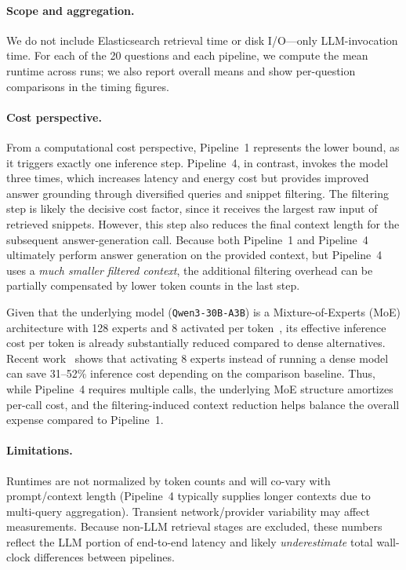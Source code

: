 \documentclass[manuscript,screen]{acmart}
\begin{document}
\begin{CCSXML}
	\paragraph{Scope and aggregation.}
	We do not include Elasticsearch retrieval time or disk I/O—only LLM-invocation time. For each
	of the 20 questions and each pipeline, we compute the mean runtime across runs; we also report
	overall means and show per-question comparisons in the timing figures.
	
	\paragraph{Cost perspective.}
	From a computational cost perspective, Pipeline~1 represents the lower bound, as it triggers
	exactly one inference step. Pipeline~4, in contrast, invokes the model three times, which
	increases latency and energy cost but provides improved answer grounding through diversified
	queries and snippet filtering. The filtering step is likely the decisive cost factor, since it
	receives the largest raw input of retrieved snippets. However, this step also reduces the final
	context length for the subsequent answer-generation call. Because both Pipeline~1 and
	Pipeline~4 ultimately perform answer generation on the provided context, but Pipeline~4 uses a
	\emph{much smaller filtered context}, the additional filtering overhead can be partially
	compensated by lower token counts in the last step.
	
	Given that the underlying model (\texttt{Qwen3-30B-A3B}) is a Mixture-of-Experts (MoE)
	architecture with 128 experts and 8 activated per token~\cite{qwen3_model}, its effective
	inference cost per token is already substantially reduced compared to dense alternatives.
	Recent work~\cite{yun2024inferenceoptimalmixtureofexpertlargelanguage} shows that activating 8 experts instead of running a
	dense model can save 31--52\% inference cost depending on the comparison baseline. Thus, while
	Pipeline~4 requires multiple calls, the underlying MoE structure amortizes per-call cost, and
	the filtering-induced context reduction helps balance the overall expense compared to Pipeline~1.
	
	\paragraph{Limitations.}
	Runtimes are not normalized by token counts and will co-vary with prompt/context length
	(Pipeline~4 typically supplies longer contexts due to multi-query aggregation). Transient
	network/provider variability may affect measurements. Because non-LLM retrieval stages are
	excluded, these numbers reflect the LLM portion of end-to-end latency and likely
	\emph{underestimate} total wall-clock differences between pipelines.


\end{CCSXML}
\end{document}
